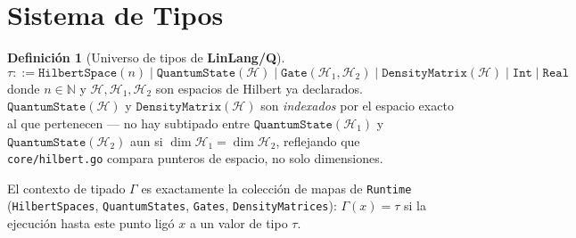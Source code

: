 \documentclass[12pt, a4paper, openany]{report}
\theoremstyle{definition}
\newtheorem{definition}{Definición}[chapter]
\newcommand{\linlangQ}{\textbf{LinLang/Q}}
\newcommand{\Hilbert}{\mathcal{H}}
\begin{document}
\section{Sistema de Tipos}
\label{sec:tipos-formal}

\begin{definition}[Universo de tipos de \linlangQ{}]
\label{def:tipos-universo}
\[
  \tau ::= \mathtt{HilbertSpace}(n) \mid \mathtt{QuantumState}(\Hilbert) \mid \mathtt{Gate}(\Hilbert_1,\Hilbert_2) \mid \mathtt{DensityMatrix}(\Hilbert) \mid \mathtt{Int} \mid \mathtt{Real}
\]
donde $n \in \mathbb{N}$ y $\Hilbert, \Hilbert_1, \Hilbert_2$ son espacios de Hilbert ya declarados. $\mathtt{QuantumState}(\Hilbert)$ y $\mathtt{DensityMatrix}(\Hilbert)$ son \emph{indexados} por el espacio exacto al que pertenecen — no hay subtipado entre $\mathtt{QuantumState}(\Hilbert_1)$ y $\mathtt{QuantumState}(\Hilbert_2)$ aun si $\dim\Hilbert_1 = \dim\Hilbert_2$, reflejando que \texttt{core/hilbert.go} compara punteros de espacio, no solo dimensiones.
\end{definition}

El contexto de tipado $\Gamma$ es exactamente la colección de mapas de \texttt{Runtime} (\texttt{HilbertSpaces}, \texttt{QuantumStates}, \texttt{Gates}, \texttt{DensityMatrices}): $\Gamma(x) = \tau$ si la ejecución hasta este punto ligó $x$ a un valor de tipo $\tau$.
\end{document}
